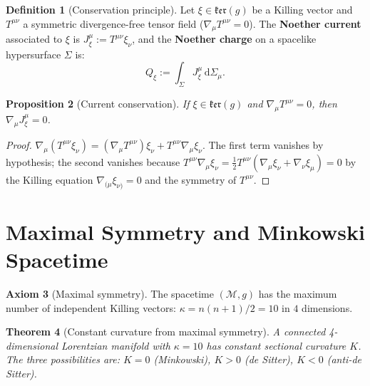 \documentclass[12pt]{article}
\theoremstyle{plain}
\newtheorem{theorem}{Theorem}[section]
\newtheorem{proposition}[theorem]{Proposition}
\theoremstyle{definition}
\newtheorem{definition}[theorem]{Definition}
\newtheorem{axiom}[theorem]{Axiom}
\theoremstyle{remark}
\newcommand{\dd}{\mathrm{d}}
\begin{document}
\begin{definition}[Conservation principle]\label{def:conservation}
Let $\xi \in \mathfrak{ker}(g)$ be a Killing vector and $T^{\mu\nu}$ a symmetric divergence-free tensor field ($\nabla_\mu T^{\mu\nu} = 0$). The \textbf{Noether current} associated to $\xi$ is $J^\mu_\xi := T^{\mu\nu}\xi_\nu$, and the \textbf{Noether charge} on a spacelike hypersurface $\Sigma$ is:
\begin{equation}
Q_\xi := \int_\Sigma J^\mu_\xi \,\dd\Sigma_\mu.
\end{equation}
\end{definition}

\begin{proposition}[Current conservation]\label{prop:conservation}
If $\xi \in \mathfrak{ker}(g)$ and $\nabla_\mu T^{\mu\nu} = 0$, then $\nabla_\mu J^\mu_\xi = 0$.
\end{proposition}

\begin{proof}
$\nabla_\mu(T^{\mu\nu}\xi_\nu) = (\nabla_\mu T^{\mu\nu})\xi_\nu + T^{\mu\nu}\nabla_\mu\xi_\nu$. The first term vanishes by hypothesis; the second vanishes because $T^{\mu\nu}\nabla_\mu\xi_\nu = \frac{1}{2}T^{\mu\nu}(\nabla_\mu\xi_\nu + \nabla_\nu\xi_\mu) = 0$ by the Killing equation $\nabla_{(\mu}\xi_{\nu)} = 0$ and the symmetry of $T^{\mu\nu}$.
\end{proof}


\section{Maximal Symmetry and Minkowski Spacetime}
\label{sec:maxsym}

\begin{axiom}[Maximal symmetry]\label{ax:maxsym}
The spacetime $(\mathcal{M}, g)$ has the maximum number of independent Killing vectors: $\kappa = n(n+1)/2 = 10$ in $4$ dimensions.
\end{axiom}

\begin{theorem}[Constant curvature from maximal symmetry]\label{thm:constcurv}
A connected 4-dimensional Lorentzian manifold with $\kappa = 10$ has constant sectional curvature $K$. The three possibilities are: $K = 0$ (Minkowski), $K > 0$ (de Sitter), $K < 0$ (anti-de Sitter).
\end{theorem}
\end{document}
